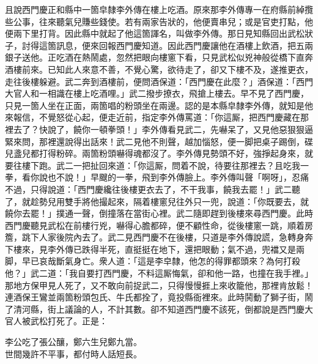 且說西門慶正和縣中一箇皁隸李外傳在樓上吃酒。原來那李外傳專一在府縣前綽攬些公事，往來聽氣兒賺些錢使。若有兩家告狀的，他便賣串兒；或是官吏打點，他便兩下里打背。因此縣中就起了他這箇諢名，叫做李外傳。那日見知縣回出武松狀子，討得這箇訊息，便來回報西門慶知道。因此西門慶讓他在酒樓上飲酒，把五兩銀子送他。正吃酒在熱鬧處，忽然把眼向樓窻下看，只見武松似兇神般從橋下直奔酒樓前來。已知此人來意不善，不覺心驚，欲待走了，卻又下樓不及，遂推更衣，走往後樓躲避。武二奔到酒樓前，便問酒保道：「西門慶在此麼？」酒保道：「西門大官人和一相識在樓上吃酒哩。」武二撥步撩衣，飛搶上樓去。早不見了西門慶，只見一箇人坐在正面，兩箇唱的粉頭坐在兩邊。{}認的是本縣皁隸李外傳，就知是他來報信，不覺怒從心起，便走近前，指定李外傳罵道：「你這厮，把西門慶藏在那裡去了？快說了，饒你一頓拳頭！」李外傳看見武二，先嚇呆了，又見他惡狠狠逼緊來問，那裡還說得出話來！武二見他不則聲，越加惱怒，便一脚把桌子踢倒，碟兒盞兒都打得粉碎。兩箇粉頭嚇得魂都沒了。李外傳見勢頭不好，強掙起身來，就要往樓下跑。武二一把扯回來道：「你這厮，問着不說，待要往那裡去？且吃我一拳，看你說也不說！」早颼的一拳，飛到李外傳臉上。李外傳叫聲「啊呀」，忍痛不過，只得說道：「西門慶纔往後樓更衣去了，不干我事，饒我去罷！」武二聽了，就趁勢兒用雙手將他撮起來，隔着樓窻兒往外只一兜，說道：「你既要去，就饒你去罷！」撲通一聲，倒撞落在當街心裡。武二隨即趕到後樓來尋西門慶。此時西門慶聽見武松在前樓行兇，嚇得心膽都碎，便不顧性命，從後樓窻一跳，順着房簷，跳下人家後院內去了。武二見西門慶不在後樓，只道是李外傳說謊，急轉身奔下樓來，見李外傳已跌得半死，直挺挺在地下，還把眼動；氣不過，兜襠又是兩脚，早已哀哉斷氣身亡。衆人道：「這是李皁隸，他怎的得罪都頭來？為何打殺他？」武二道：「我自要打西門慶，不料這厮悔氣，卻和他一路，也撞在我手裡。」那地方保甲見人死了，又不敢向前捉武二，只得慢慢捱上來收籠他，那裡肯放鬆！連酒保王鸞並兩箇粉頭包氏、牛氏都拴了，竟投縣衙裡來。此時鬨動了獅子街，鬧了清河縣，街上議論的人，不計其數。卻不知道西門慶不該死，倒都說是西門慶大官人被武松打死了。{}正是：

\begin{myquote}
李公吃了張公釀，鄭六生兒鄭九當。\\世間幾許不平事，都付時人話短長。
\end{myquote}

 

